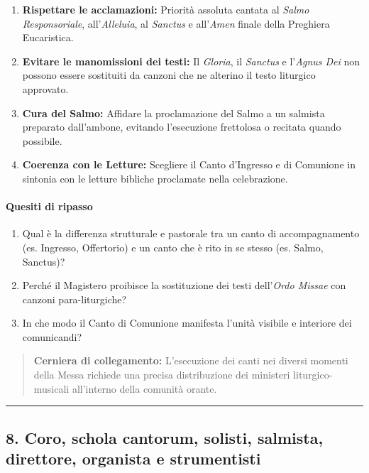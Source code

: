 \documentclass[12pt,a4paper]{article}
\begin{document}
	\begin{enumerate}[label=\arabic*.,leftmargin=*]
		\item \textbf{Rispettare le acclamazioni:} Priorità assoluta cantata al \emph{Salmo Responsoriale}, all'\emph{Alleluia}, al \emph{Sanctus} e all'\emph{Amen} finale della Preghiera Eucaristica.
		\item \textbf{Evitare le manomissioni dei testi:} Il \emph{Gloria}, il \emph{Sanctus} e l'\emph{Agnus Dei} non possono essere sostituiti da canzoni che ne alterino il testo liturgico approvato.
		\item \textbf{Cura del Salmo:} Affidare la proclamazione del Salmo a un salmista preparato dall'ambone, evitando l'esecuzione frettolosa o recitata quando possibile.
		\item \textbf{Coerenza con le Letture:} Scegliere il Canto d'Ingresso e di Comunione in sintonia con le letture bibliche proclamate nella celebrazione.
	\end{enumerate}
	
	\paragraph{Quesiti di ripasso}\label{quesiti-di-ripasso-1}
	
	\begin{enumerate}[label=\arabic*.,leftmargin=*]
		\item Qual è la differenza strutturale e pastorale tra un canto di accompagnamento (es. Ingresso, Offertorio) e un canto che è rito in se stesso (es. Salmo, Sanctus)?
		\item Perché il Magistero proibisce la sostituzione dei testi dell'\emph{Ordo Missae} con canzoni para-liturgiche?
		\item In che modo il Canto di Comunione manifesta l'unità visibile e interiore dei comunicandi?
	\end{enumerate}
	
	\begin{quote}
		\textbf{Cerniera di collegamento:} L'esecuzione dei canti nei diversi momenti della Messa richiede una precisa distribuzione dei ministeri liturgico-musicali all'interno della comunità orante.
	\end{quote}
	
	\begin{center}\rule{0.5\linewidth}{0.5pt}\end{center}
	
	\subsection{8. Coro, schola cantorum, solisti, salmista, direttore, organista e strumentisti}\label{coro-schola-cantorum-solisti-salmista-direttore-organista-e-strumentisti}
	
\end{document}
